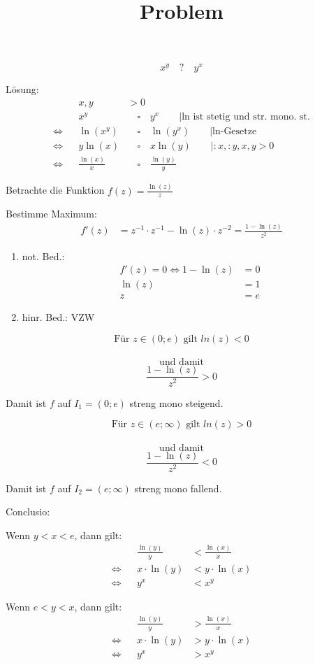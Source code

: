 \documentclass[
  11pt,
  a4paper,
  DIV=11,
  numbers=noendperiod]{scrartcl}
\title{Problem}
\author{}
\date{}
\begin{document}
\maketitle

\[x^y \quad ? \quad y^x\]

Lösung: \[
\begin{aligned}
&& x,y &> 0\\
&& x^y & \quad\square\quad  y^x \qquad |\text{ln ist stetig und str. mono. st.}\\
\Leftrightarrow&& \ln(x^y) & \quad\square\quad \ln(y^x)\qquad |\text{ln-Gesetze}\\
\Leftrightarrow&& y \ln(x) & \quad\square\quad x\ln(y)\qquad |:x, :y, x, y > 0\\
\Leftrightarrow&& \frac{\ln(x)}{x }& \quad\square\quad \frac{\ln(y)}{y}
\end{aligned}
\]

Betrachte die Funktion \(f(z)=\frac{\ln(z)}{z}\)

Bestimme Maximum:\\
\[
\begin{aligned}
f'(z)& = z^{-1}\cdot z^{-1} - \ln(z)\cdot z^{-2} = \frac{1-\ln(z)}{z^2}
\end{aligned}
\]

\begin{enumerate}
\def\labelenumi{\arabic{enumi}.}
\item
  not. Bed.:\\
  \[
  \begin{aligned}
  f'(z)=0 \Leftrightarrow 1-\ln(z)&=0\\
  \ln(z) &= 1\\
  z & = e
  \end{aligned}
  \]
\item
  hinr. Bed.: VZW
\end{enumerate}

\[ \text{Für }z \in (0; e) \text{ gilt } ln(z)<0\]\\
\[ \text{und damit}\] \[ \frac{1-\ln(z)}{z^2}>0\]

Damit ist \(f\) auf \(I_1=(0; e)\) streng mono steigend.

\[ \text{Für }z \in (e; \infty) \text{ gilt } ln(z)>0\]\\
\[ \text{und damit}\] \[ \frac{1-\ln(z)}{z^2}<0\]

Damit ist \(f\) auf \(I_2=(e; \infty)\) streng mono fallend.

Conclusio:

Wenn \(y<x<e\), dann gilt: \[
\begin{aligned}
&& \frac{\ln(y)}{y} & < \frac{\ln(x)}{x}\\
\Leftrightarrow && x\cdot \ln(y) & < y \cdot \ln(x)\\
\Leftrightarrow && y^x &< x^y
\end{aligned}
\]

Wenn \(e<y<x\), dann gilt: \[
\begin{aligned}
&& \frac{\ln(y)}{y} & > \frac{\ln(x)}{x}\\
\Leftrightarrow && x\cdot \ln(y) & > y \cdot \ln(x)\\
\Leftrightarrow && y^x &> x^y
\end{aligned}
\]
\end{document}
